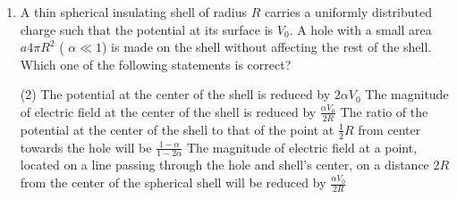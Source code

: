 
\begin{enumerate}
    \item A thin spherical insulating shell of radius \( R \) carries a uniformly distributed charge such that the potential at its surface is \( V_0 \). A hole with a small area \( a4\pi R^2 \) ( \( \alpha \ll 1 \)) is made on the shell without affecting the rest of the shell. Which one of the following statements is correct?
        \begin{tasks}(2)
            \task The potential at the center of the shell is reduced by \( 2\alpha V_0 \)
            \task The magnitude of electric field at the center of the shell is reduced by \( \frac{\alpha V_0}{2R} \)
            \task The ratio of the potential at the center of the shell to that of the point at \( \frac{1}{2} R \) from center towards the hole will be \( \frac{1-\alpha}{1-2\alpha} \)
            \task The magnitude of electric field at a point, located on a line passing through the hole and shell’s center, on a distance \( 2R \) from the center of the spherical shell will be reduced by \( \frac{\alpha V_0}{2R} \)
        \end{tasks}
\end{enumerate}
